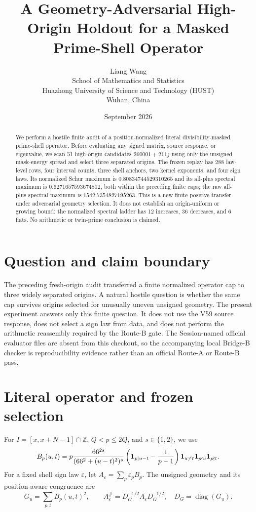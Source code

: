 \documentclass[10pt]{article}
\title{A Geometry-Adversarial High-Origin Holdout for a Masked Prime-Shell Operator}
\author{Liang Wang\\
\small School of Mathematics and Statistics\\
\small Huazhong University of Science and Technology (HUST)\\
\small Wuhan, China}
\date{September 2026}
\begin{document}
\maketitle

\begin{abstract}
We perform a hostile finite audit of a position-normalized literal
divisibility-masked prime-shell operator.  Before evaluating any signed
matrix, source response, or eigenvalue, we scan 51 high-origin candidates
$260001+211j$ using only the unsigned mask-energy spread and select three
separated origins.  The frozen replay has 288 law-level rows, four interval
counts, three shell anchors, two kernel exponents, and four sign laws.  Its
normalized Schur maximum is $0.80834744529310265$ and its all-plus spectral
maximum is $0.6271657593674812$, both within the preceding finite caps; the
raw all-plus spectral maximum is $1542.7354827195263$.  This is a new finite
positive transfer under adversarial geometry selection.  It does not establish
an origin-uniform or growing bound: the normalized spectral ladder has 12
increases, 36 decreases, and 6 flats.  No arithmetic or twin-prime conclusion
is claimed.
\end{abstract}

\section{Question and claim boundary}

The preceding fresh-origin audit transferred a finite normalized operator cap
to three widely separated origins.  A natural hostile question is whether the
same cap survives origins selected for unusually uneven unsigned geometry.
The present experiment answers only this finite question.  It does not use the
V59 source response, does not select a sign law from data, and does not perform
the arithmetic reassembly required by the Route-B gate.  The Session-named
official evaluator files are absent from this checkout, so the accompanying
local Bridge-B checker is reproducibility evidence rather than an official
Route-A or Route-B pass.

\section{Literal operator and frozen selection}

For $I=[x,x+N-1]\cap\mathbb Z$, $Q<p\leq2Q$, and $s\in\{1,2\}$, we use
\begin{equation}
 B_p(u,t)=p\frac{66^{2s}}{(66^2+(u-t)^2)^s}
 \left({\bf1}_{p\mid u-t}-\frac1{p-1}\right)
 {\bf1}_{u\ne t}{\bf1}_{p\nmid u}{\bf1}_{p\nmid t}.
 \label{eq:block}
\end{equation}
For a fixed shell sign law $\varepsilon$, let
$A_\varepsilon=\sum_p\varepsilon_pB_p$.  The unsigned geometry and its
position-aware congruence are
\begin{equation}
 G_u=\sum_{p,t}B_p(u,t)^2,\qquad
 A_\varepsilon^\#=D_G^{-1/2}A_\varepsilon D_G^{-1/2},
 \quad D_G=\operatorname{diag}(G_u).
 \label{eq:norm}
\end{equation}
\end{document}
